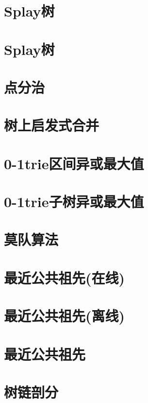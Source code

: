 \section{Splay树}
\raggedbottom
\hrulefill
\section{Splay树}
\raggedbottom
\hrulefill
\section{点分治}
\raggedbottom
\hrulefill
\section{树上启发式合并}
\raggedbottom
\hrulefill
\section{	0-1trie区间异或最大值}
\raggedbottom
\hrulefill
\section{	0-1trie子树异或最大值}
\raggedbottom
\hrulefill
\section{莫队算法}
\raggedbottom
\hrulefill
\section{最近公共祖先(在线)}
\raggedbottom
\hrulefill
\section{最近公共祖先(离线)}
\raggedbottom
\hrulefill
\section{最近公共祖先}
\raggedbottom
\hrulefill
\section{树链剖分}
\raggedbottom
\hrulefill


